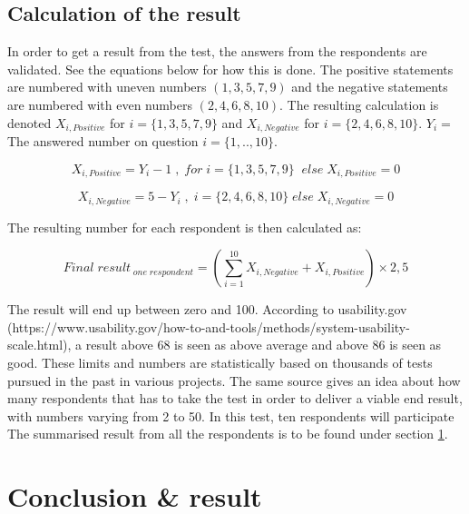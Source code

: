 \documentclass[12pt]{article}
\begin{document}
    \subsection{Calculation of the result}
    In order to get a result from the test, the answers from the respondents are validated. See the equations below for how this is done. The positive statements are numbered with uneven numbers $(1, 3, 5, 7, 9)$ and the negative statements are numbered with even numbers $(2, 4, 6, 8, 10)$. The resulting calculation is denoted $X_{i,Positive}$ for $ i = \{1,3,5,7,9\}$ and $X_{i,Negative}$ for $ i = \{2,4,6,8,10\}$. $Y_i = $ The answered number on question $ i = \{1,..,10\}$.

     \begin{equation}
        X_{i,Positive} = Y_i - 1 \;, \;for \;i = \{1,3,5,7,9\} \; \;else\;  X_{i,Positive} = 0
     \end{equation}
    
     \begin{equation}
         X_{i,Negative} = 5 - Y_i \;,\; i = \{2,4,6,8,10\}  \;else\;  X_{i,Negative} = 0
     \end{equation}
     
\begin{center}
    The resulting number for each respondent is then calculated as: 
\end{center}     
     
     \begin{equation}
         {Final\;result}_{\;one\;respondent} =  (\sum_{i=1}^{10} X_{i,Negative} + X_{i,Positive} ) \times 2,5 
     \end{equation}
   
    The result will end up between zero and 100. According to usability.gov (https://www.usability.gov/how-to-and-tools/methods/system-usability-scale.html), a result above 68 is seen as above average and above 86 is seen as good. These limits and numbers are statistically based on thousands of tests pursued in the past in various projects. The same source gives an idea about how many respondents that has to take the test in order to deliver a viable end result, with numbers varying from 2 to 50. In this test, ten respondents will participate The summarised result from all the respondents is to be found under section \ref{sec: Conclusion}.
   
    \label{ref: Calculations}
    \section{Conclusion \& result}
    \label{sec: Conclusion}
    
\end{document}
